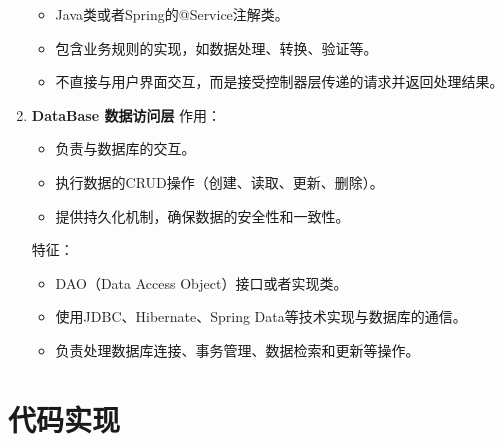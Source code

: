 \documentclass{article}
\begin{document}
\begin{enumerate}
\begin{itemize}
        \item Java类或者Spring的@Service注解类。
        \item 包含业务规则的实现，如数据处理、转换、验证等。
        \item 不直接与用户界面交互，而是接受控制器层传递的请求并返回处理结果。
        \end{itemize}
    \item \textbf{DataBase 数据访问层} \newline
    作用：
        \begin{itemize}
        \item 负责与数据库的交互。
        \item 执行数据的CRUD操作（创建、读取、更新、删除）。
        \item 提供持久化机制，确保数据的安全性和一致性。
        \end{itemize}
    特征：
        \begin{itemize}
        \item DAO（Data Access Object）接口或者实现类。
        \item 使用JDBC、Hibernate、Spring Data等技术实现与数据库的通信。
        \item 负责处理数据库连接、事务管理、数据检索和更新等操作。
        \end{itemize}
\end{enumerate}

\section{代码实现}
\end{document}

